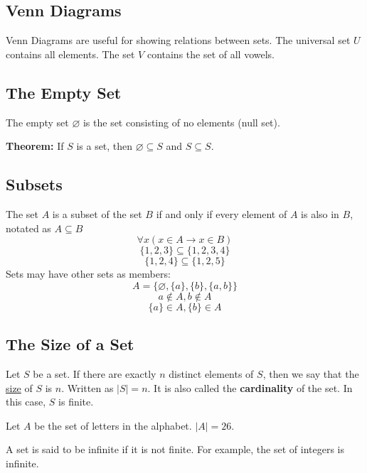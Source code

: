 \documentclass[letterpaper, 12pt]{math}
\begin{document}
\subsection*{Venn Diagrams}
Venn Diagrams are useful for showing relations between sets. The universal
set \( U \) contains all elements. The set \( V \) contains the set of all
vowels.
\begin{center}
\end{center}

\subsection*{The Empty Set}
The empty set \( \varnothing \) is the set consisting of no elements (null set).
\par
\textbf{Theorem:} If \( S \) is a set, then \( \varnothing \subseteq S \) and
\( S \subseteq S \).

\subsection*{Subsets}
The set \( A \) is a subset of the set \( B \) if and only if every element of
\( A \) is also in \( B \), notated as \( A \subseteq B \)
\[ \forall{x}(x \in A \to x \in B) \]
\[ \bigg\{1,2,3\bigg\} \subseteq \bigg\{1,2,3,4\bigg\} \]
\[ \bigg\{1,2,4\bigg\} \subseteq \bigg\{1,2,5\bigg\} \]
Sets may have other sets as members:
\[ A = \{\varnothing, \{a\}, \{b\}, \{a,b\}\} \]
\[ a \notin A, b \notin A \]
\[ \{a\} \in A, \{b\} \in A \]

\subsection*{The Size of a Set}
Let \( S \) be a set. If there are exactly \( n \) distinct elements of \( S \),
then we say that the \underline{size} of \( S \) is \( n \). Written as
\( |S| = n \). It is also called the \textbf{cardinality} of the set. In this
case, \( S \) is finite. \par
Let \( A \) be the set of letters in the alphabet. \( |A| = 26 \). \par
A set is said to be infinite if it is not finite. For example, the set of
integers is infinite.
\end{document}
